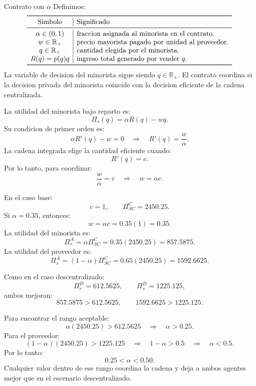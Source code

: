 \begin{solucion}{Contrato con \(\alpha\)}
Definimos:
\[
\begin{array}{c|l}
\toprule
\text{Simbolo} & \text{Significado} \\
\midrule
\alpha\in(0,1) & \text{fraccion asignada al minorista en el contrato.}\\
w\in\mathbb{R}_+ & \text{precio mayorista pagado por unidad al proveedor.}\\
q\in\mathbb{R}_+ & \text{cantidad elegida por el minorista.}\\
R(q)=p(q)q & \text{ingreso total generado por vender } q.\\
\bottomrule
\end{array}
\]
La variable de decision del minorista sigue siendo \(q\in\mathbb{R}_+\). El contrato coordina si la decision privada del minorista coincide con la decision eficiente de la cadena centralizada.

La utilidad del minorista bajo reparto es:
\[
\Pi_r(q)=\alpha R(q)-wq.
\]
Su condicion de primer orden es:
\[
\alpha R'(q)-w=0
\quad\Rightarrow\quad
R'(q)=\frac{w}{\alpha}.
\]
La cadena integrada elige la cantidad eficiente cuando:
\[
R'(q)=c.
\]
Por lo tanto, para coordinar:
\[
\frac{w}{\alpha}=c
\quad\Rightarrow\quad
\boxed{w=\alpha c}.
\]

En el caso base:
\[
c=1,
\qquad
\Pi_{SC}^C=2450.25.
\]
Si \(\alpha=0.35\), entonces:
\[
w=\alpha c=0.35(1)=0.35.
\]
La utilidad del minorista es:
\[
\Pi_r^A=\alpha\Pi_{SC}^C
=0.35(2450.25)
=857.5875.
\]
La utilidad del proveedor es:
\[
\Pi_s^A=(1-\alpha)\Pi_{SC}^C
=0.65(2450.25)
=1592.6625.
\]

Como en el caso descentralizado:
\[
\Pi_r^D=612.5625,
\qquad
\Pi_s^D=1225.125,
\]
ambos mejoran:
\[
857.5875>612.5625,
\qquad
1592.6625>1225.125.
\]

Para encontrar el rango aceptable:
\[
\alpha(2450.25)>612.5625
\quad\Rightarrow\quad
\alpha>0.25.
\]
Para el proveedor:
\[
(1-\alpha)(2450.25)>1225.125
\quad\Rightarrow\quad
1-\alpha>0.5
\quad\Rightarrow\quad
\alpha<0.5.
\]
Por lo tanto:
\[
\boxed{0.25<\alpha<0.50.}
\]
Cualquier valor dentro de ese rango coordina la cadena y deja a ambos agentes mejor que en el escenario descentralizado.
\end{solucion}
